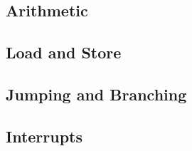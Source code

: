 \subsection{Arithmetic}
\subsection{Load and Store}
\subsection{Jumping and Branching}
\subsection{Interrupts}







